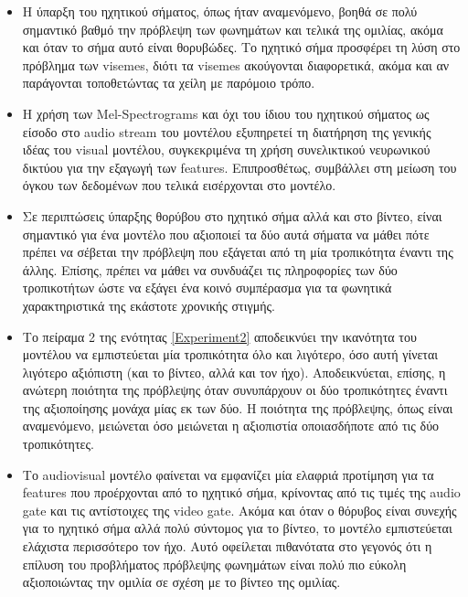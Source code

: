 \begin{itemize}
\item Η ύπαρξη του ηχητικού σήματος, όπως ήταν αναμενόμενο, βοηθά σε πολύ σημαντικό βαθμό την πρόβλεψη των φωνημάτων και τελικά της ομιλίας, ακόμα και όταν το σήμα αυτό είναι θορυβώδες. Το ηχητικό σήμα προσφέρει τη λύση στο πρόβλημα των visemes, διότι τα visemes ακούγονται διαφορετικά, ακόμα και αν παράγονται τοποθετώντας τα χείλη με παρόμοιο τρόπο.

\item Η χρήση των Mel-Spectrograms και όχι του ίδιου του ηχητικού σήματος ως είσοδο στο audio stream του μοντέλου εξυπηρετεί τη διατήρηση της γενικής ιδέας του visual μοντέλου, συγκεκριμένα τη χρήση συνελικτικού νευρωνικού δικτύου για την εξαγωγή των features. Επιπροσθέτως, συμβάλλει στη μείωση του όγκου των δεδομένων που τελικά εισέρχονται στο μοντέλο.

\item Σε περιπτώσεις ύπαρξης θορύβου στο ηχητικό σήμα αλλά και στο βίντεο, είναι σημαντικό για ένα μοντέλο που αξιοποιεί τα δύο αυτά σήματα να μάθει πότε πρέπει να σέβεται την πρόβλεψη που εξάγεται από τη μία τροπικότητα έναντι της άλλης. Επίσης, πρέπει να μάθει να συνδυάζει τις πληροφορίες των δύο τροπικοτήτων ώστε να εξάγει ένα κοινό συμπέρασμα για τα φωνητικά χαρακτηριστικά της εκάστοτε χρονικής στιγμής.

\item Το πείραμα 2 της ενότητας \ref{Experiment2} αποδεικνύει την ικανότητα του μοντέλου να εμπιστεύεται μία τροπικότητα όλο και λιγότερο, όσο αυτή γίνεται λιγότερο αξιόπιστη (και το βίντεο, αλλά και τον ήχο). Αποδεικνύεται, επίσης, η ανώτερη ποιότητα της πρόβλεψης όταν συνυπάρχουν οι δύο τροπικότητες έναντι της αξιοποίησης μονάχα μίας εκ των δύο. Η ποιότητα της πρόβλεψης, όπως είναι αναμενόμενο, μειώνεται όσο μειώνεται η αξιοπιστία οποιασδήποτε από τις δύο τροπικότητες.

\item Το audiovisual μοντέλο φαίνεται να εμφανίζει μία ελαφριά προτίμηση για τα features που προέρχονται από το ηχητικό σήμα, κρίνοντας από τις τιμές της audio gate και τις αντίστοιχες της video gate. Ακόμα και όταν ο θόρυβος είναι συνεχής για το ηχητικό σήμα αλλά πολύ σύντομος για το βίντεο, το μοντέλο εμπιστεύεται ελάχιστα περισσότερο τον ήχο. Αυτό οφείλεται πιθανότατα στο γεγονός ότι η επίλυση του προβλήματος πρόβλεψης φωνημάτων είναι πολύ πιο εύκολη αξιοποιώντας την ομιλία σε σχέση με το βίντεο της ομιλίας.
\end{itemize}

